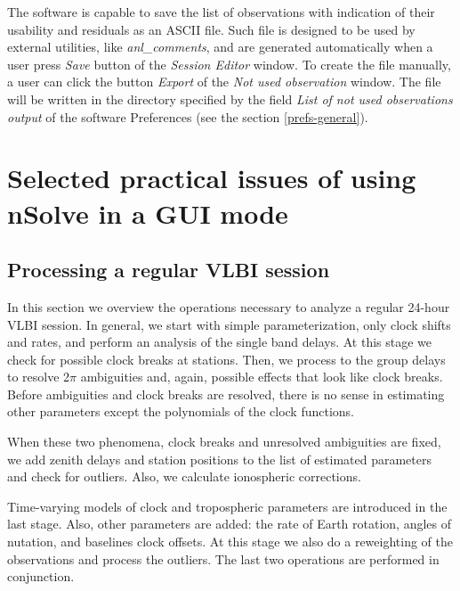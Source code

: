 \documentclass [10pt,letterpaper]{report}
\newcommand{\nuSolve}{\greektext n\latintext Solve}
\begin{document}
The software is capable to save the list of observations with indication
of their usability and residuals as an ASCII file. Such file is designed to
be used by external utilities, like {\sl anl\_comments}, and are generated
automatically when a user press {\sl Save} button of the {\sl Session Editor}
window. To create the file manually, a user can click the button {\sl Export}
of the {\sl Not used observation} window. The file will be written in the
directory specified by the field {\sl List of not used observations output}
of the software Preferences (see the section \ref{prefs-general}).






%
%
%
%
\chapter{Selected practical issues of using \nuSolve{} in a GUI mode}
\label{chapter-using-gui-mode}



%
%
%
%
\section{Processing a regular VLBI session}
\label{sect-processing-a-session}
In this section we overview the operations necessary to analyze a
regular 24-hour VLBI session. In general, we start with simple
parameterization, only clock shifts and rates, and perform an analysis
of the single band delays. At this stage we check for possible clock
breaks at stations. Then, we process to the group delays to resolve
2$\pi$ ambiguities and, again, possible effects that look like clock
breaks. Before ambiguities and clock breaks are resolved, there is no
sense in estimating other parameters except the polynomials of the clock
functions.

When these two phenomena, clock breaks and unresolved ambiguities are
fixed, we add zenith delays and station positions to the list of
estimated parameters and check for outliers. Also, we calculate
ionospheric corrections.

Time-varying models of clock and tropospheric parameters are introduced
in the last stage. Also, other parameters are added: the rate of Earth
rotation, angles of nutation, and baselines clock offsets. At this stage
we also do a reweighting of the observations and process the outliers.
The last two operations are performed in conjunction.
\end{document}
